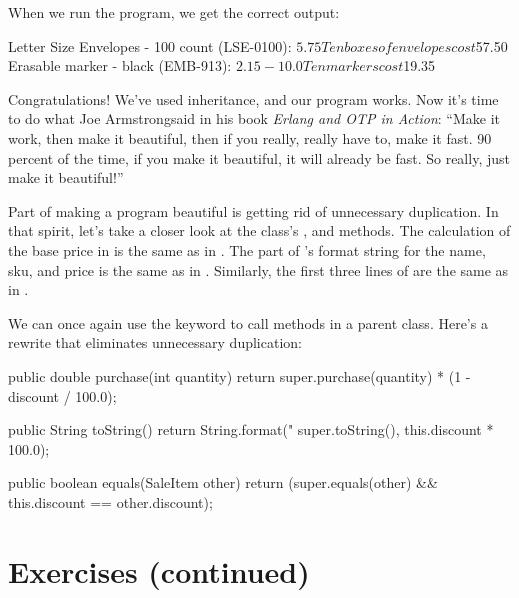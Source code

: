 When we run the program, we get the correct output:

\begin{stdout}
Letter Size Envelopes - 100 count (LSE-0100): $5.75
Ten boxes of envelopes cost $57.50
Erasable marker - black (EMB-913): $2.15 - 10.0%
Ten markers cost $19.35
\end{stdout}

Congratulations! We've used inheritance, and our program works. Now it's time to do what Joe Armstrong\footnotemark said in his book {\em Erlang and OTP in Action}: ``Make it work, then make it beautiful, then if you really, really have to, make it fast. 90 percent of the time, if you make it beautiful, it will already be fast. So really, just make it beautiful!”


Part of making a program beautiful is getting rid of unnecessary duplication. In that spirit, let's take a closer look at the  class's ,  and  methods. The calculation of the base price in  is the same as in . The part of 's format string for the name, sku, and price is the same as in . Similarly, the first three lines of  are the same as in .

We can once again use the  keyword to call methods in a parent class. Here's a rewrite that eliminates unnecessary duplication:

\begin{code}
public double purchase(int quantity) {
    return super.purchase(quantity) *
        (1 - discount / 100.0);
}

public String toString() {
    return String.format("%
        super.toString(),
        this.discount * 100.0);
}

public boolean equals(SaleItem other) {
    return (super.equals(other) &&
        this.discount == other.discount);
}
\end{code}


\section{Exercises (continued)}

